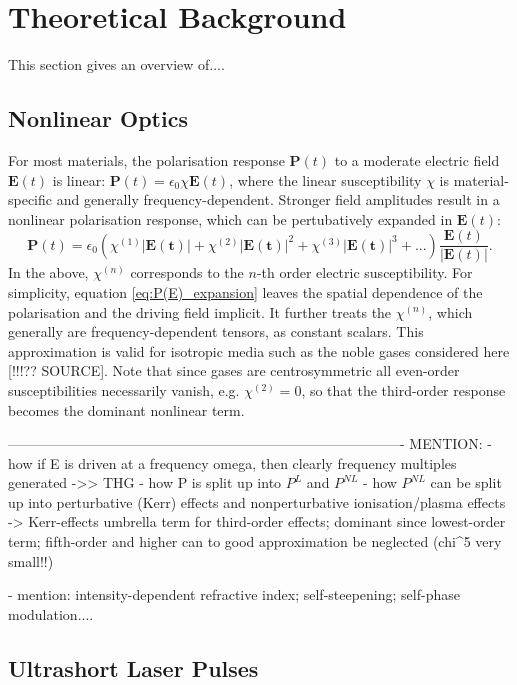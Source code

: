 \documentclass[a4paper]{jpconf}
\begin{document}
\section{Theoretical Background}
This section gives an overview of....

\subsection{Nonlinear Optics}
For most materials, the polarisation response $\mathbf{P}(t)$ to a moderate electric field $\mathbf{E}(t)$ is linear: $\mathbf{P}(t) = \epsilon_0 \chi \mathbf{E}(t)$, where the linear susceptibility $\chi$ is material-specific and generally frequency-dependent. Stronger field amplitudes result in a nonlinear polarisation response, which can be pertubatively expanded in $\mathbf{E}(t)$:
\begin{equation}\label{eq:P(E)_expansion}
\mathbf{P}(t) = \epsilon_0 \left( \chi^{(1)}|\mathbf{E(t)}| + \chi^{(2)}|\mathbf{E(t)}|^2 +  \chi^{(3)}|\mathbf{E(t)}|^3 + ...  \right) \frac{\mathbf{E}(t)}{|\mathbf{E}(t)|}.
\end{equation}
In the above, $\chi^{(n)}$ corresponds to the $n$-th order electric susceptibility. For simplicity, equation \eqref{eq:P(E)_expansion} leaves the spatial dependence of the polarisation and the driving field implicit. It further treats the $\chi^{(n)}$, which generally are frequency-dependent tensors, as constant scalars. This approximation is valid for isotropic media such as the noble gases considered here [!!!?? SOURCE]. Note that since gases are centrosymmetric all even-order susceptibilities necessarily vanish, e.g. $\chi^{(2)}=0$, so that the third-order response becomes the dominant nonlinear term. 

-------------------------------------------------------------------------------------
MENTION:
	- how if E is driven at a frequency omega, then clearly frequency multiples generated ->> THG 
	- how P is split up into $P^L$ and $P^{NL}$
	- how $P^{NL}$ can be split up into perturbative (Kerr) effects and nonperturbative ionisation/plasma effects 
				-> Kerr-effects umbrella term for third-order effects; 
					dominant since lowest-order term; fifth-order and higher can to good approximation be neglected (chi^5 very small!!)
					
	- mention: intensity-dependent refractive index; self-steepening; self-phase modulation....
\subsection{Ultrashort Laser Pulses}
\end{document}
